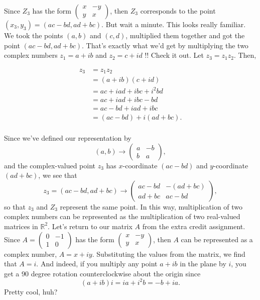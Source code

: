 \documentclass{article}
\begin{document}
Since $Z_3$ has the form $\begin{pmatrix}x & -y\\y & x\end{pmatrix}$, then $Z_3$ corresponds to the point $\left(x_3, y_3\right) = \left(ac - bd, ad + bc \right)$. But wait a minute. This looks really familiar. We took the points $\left(a, b\right)$ and $\left(c, d\right)$, multiplied them together and got the point $\left( ac - bd, ad + bc\right)$. That's exactly what we'd get by multiplying the two complex numbers $z_1 = a + ib$ and $z_2 = c + id$ !! Check it out. Let $z_3 = z_1 z_2$. Then,

\begin{align*}
z_3 &= z_1 z_2\\
&= \left(a + ib\right)\left(c + id\right)\\
&= ac + iad + ibc + i^2bd\\
&= ac + iad + ibc - bd\\
&= ac - bd + iad + ibc\\
&= \left(ac - bd\right) + i\left(ad + bc\right).\\
\end{align*}

Since we've defined our representation by $$\left(a, b\right) \rightarrow \begin{pmatrix}a & -b\\b & a\end{pmatrix},$$ and the complex-valued point $z_3$ has $x$-coordinate $\left(ac - bd\right)$ and $y$-coordinate $\left( ad + bc\right)$, we see that $$z_3 = \left(ac - bd, ad+ bc\right) \rightarrow \begin{pmatrix}ac - bd & -\left(ad + bc\right)\\ad + bc & ac - bd\end{pmatrix},$$ so that $z_3$ and $Z_3$ represent the same point. In this way, multiplication of two complex numbers can be represented as the multiplication of two real-valued matrices in $\mathbb{R}^2$. Let's return to our matrix $A$ from the extra credit assignment.\\

Since $A = \begin{pmatrix}0 & -1 \\ 1 & 0\end{pmatrix}$ has the form $\begin{pmatrix}x & -y \\ y & x\end{pmatrix}$, then $A$ can be represented as a complex number, $A = x + iy$. Substituting the values from the matrix, we find that $A = i.$ And indeed, if you multiply any point $a + ib$ in the plane by $i$, you get a 90 degree rotation counterclockwise about the origin since $$\left(a + ib\right)i = ia + i^2b = -b + ia.$$ 
Pretty cool, huh?
\end{document}
